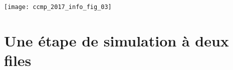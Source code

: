 %

\begin{center}
	\texttt{[image: ccmp\_2017\_info\_fig\_03]}
\end{center}




\section{Une étape de simulation à deux files}

